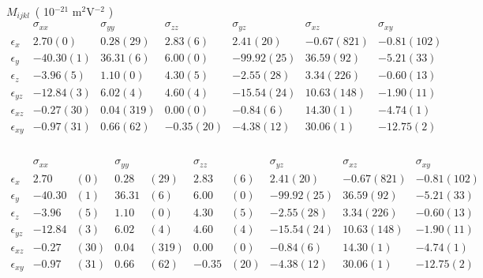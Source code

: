 \documentclass[a4paper,10pt]{article}
\begin{document}
$M_{ijkl}$~( 10$^{-21}$ m$^{2}$V$^{-2}$ )\\
$
\begin{matrix}
               &\sigma_{xx}   & \sigma_{yy}    & \sigma_{zz}    & \sigma_{yz}    & \sigma_{xz}    & \sigma_{xy}    \\
 \epsilon_{x}  &  2.70(    0) &    0.28(   29) &    2.83(    6) &    2.41(   20) &   -0.67(  821) &   -0.81(  102) \\
 \epsilon_{y}  &-40.30(    1) &   36.31(    6) &    6.00(    0) &  -99.92(   25) &   36.59(   92) &   -5.21(   33) \\ 
 \epsilon_{z}  & -3.96(    5) &    1.10(    0) &    4.30(    5) &   -2.55(   28) &    3.34(  226) &   -0.60(   13) \\
 \epsilon_{yz} &-12.84(    3) &    6.02(    4) &    4.60(    4) &  -15.54(   24) &   10.63(  148) &   -1.90(   11) \\
 \epsilon_{xz} & -0.27(   30) &    0.04(  319) &    0.00(    0) &   -0.84(    6) &   14.30(    1) &   -4.74(    1) \\
 \epsilon_{xy} & -0.97(   31) &    0.66(   62) &   -0.35(   20) &   -4.38(   12) &   30.06(    1) &  -12.75(    2) \\
\end{matrix}
$
\\
\\
$
\begin{matrix}
               &\sigma_{xx} &      & \sigma_{yy}  &      & \sigma_{zz} &     & \sigma_{yz} & \sigma_{xz}    & \sigma_{xy}    \\
 \epsilon_{x}  &  2.70      & ( 0) &    0.28      &( 29) &    2.83     &( 6) &    2.41(20) &   -0.67(821) &   -0.81(102) \\
 \epsilon_{y}  &-40.30      & ( 1) &   36.31      &(  6) &    6.00     &( 0) &  -99.92(25) &   36.59( 92) &   -5.21( 33) \\ 
 \epsilon_{z}  & -3.96      & ( 5) &    1.10      &(  0) &    4.30     &( 5) &   -2.55(28) &    3.34(226) &   -0.60( 13) \\
 \epsilon_{yz} &-12.84      & ( 3) &    6.02      &(  4) &    4.60     &( 4) &  -15.54(24) &   10.63(148) &   -1.90( 11) \\
 \epsilon_{xz} & -0.27      & (30) &    0.04      &(319) &    0.00     &( 0) &   -0.84( 6) &   14.30(  1) &   -4.74(  1) \\
 \epsilon_{xy} & -0.97      & (31) &    0.66      &( 62) &   -0.35     &(20) &   -4.38(12) &   30.06(  1) &  -12.75(  2) \\
\end{matrix}
$
\\
\end{document}
